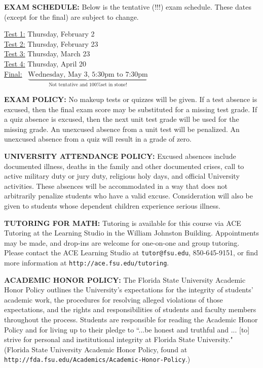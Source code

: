 \documentclass[12pt,oneside]{amsart}
\begin{document}
\vspace{12pt}

\noindent \textbf{EXAM SCHEDULE:} Below is the tentative (!!!) exam schedule. These dates (except for the final) are subject to change.\vspace{-3mm}

\indent \ul{Test 1:} Thursday, February 2
\\[1.5mm]
\indent \ul{Test 2:} Thursday, February 23
\\[1.5mm]
\indent \ul{Test 3:} Thursday, March 23
\\[1.5mm]
\indent \ul{Test 4:} Thursday, April 20
\\[3mm]
\indent \ul{Final:}\,\,\, $\underbrace{\text{Wednesday, May 3, 5:30pm to 7:30pm}}_\text{Not tentative and 100\% set in stone!}$

\newpage

\noindent \textbf{EXAM POLICY:} No makeup tests or quizzes will be given. If a test absence is excused, then the final exam score may be substituted for a missing test grade. If a quiz absence is excused, then the next unit test grade will be used for the missing grade. An unexcused absence from a unit test will be penalized. An unexcused absence from a quiz will result in a grade of zero. 

\noindent \textbf{UNIVERSITY ATTENDANCE POLICY:} Excused absences include documented illness, deaths in the family and other documented crises, call to active military duty or jury duty, religious holy days, and official University activities. These absences will be accommodated in a way that does not arbitrarily penalize students who have a valid excuse. Consideration will also be given to students whose dependent children experience serious illness.

\noindent \textbf{TUTORING FOR MATH:} Tutoring is available for this course via ACE Tutoring at the Learning Studio in the William Johnston Building.  Appointments may be made, and drop-ins are welcome for one-on-one and group tutoring.  Please contact the ACE Learning Studio at \texttt{tutor@fsu.edu}, 850-645-9151, or find more information at \texttt{http://ace.fsu.edu/tutoring}.

\noindent \textbf{ACADEMIC HONOR POLICY:} The Florida State University Academic Honor Policy outlines the University's expectations for the integrity of students' academic work, the procedures for resolving alleged violations of those expectations, and the rights and responsibilities of students and faculty members throughout the process. Students are responsible for reading the Academic Honor Policy and for living up to their pledge to ``...be honest and truthful and ... [to] strive for personal and institutional integrity at Florida State University." (Florida State University Academic Honor Policy, found at \texttt{http://fda.fsu.edu/Academics/Academic-Honor-Policy}.)
\end{document}
